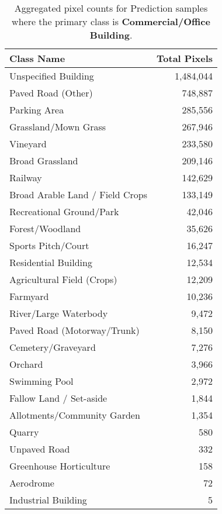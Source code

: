 \begin{table}[H] %
    \centering
    \caption{Aggregated pixel counts for Prediction samples where the primary class is \textbf{Commercial/Office Building}.}
    \label{tab:pred_counts_2}
    \begin{tabular}{lr}
        \hline
        \textbf{Class Name} & \textbf{Total Pixels} \\
        \hline
        Unspecified Building & 1,484,044 \\
        Paved Road (Other) & 748,887 \\
        Parking Area & 285,556 \\
        Grassland/Mown Grass & 267,946 \\
        Vineyard & 233,580 \\
        Broad Grassland & 209,146 \\
        Railway & 142,629 \\
        Broad Arable Land / Field Crops & 133,149 \\
        Recreational Ground/Park & 42,046 \\
        Forest/Woodland & 35,626 \\
        Sports Pitch/Court & 16,247 \\
        Residential Building & 12,534 \\
        Agricultural Field (Crops) & 12,209 \\
        Farmyard & 10,236 \\
        River/Large Waterbody & 9,472 \\
        Paved Road (Motorway/Trunk) & 8,150 \\
        Cemetery/Graveyard & 7,276 \\
        Orchard & 3,966 \\
        Swimming Pool & 2,972 \\
        Fallow Land / Set-aside & 1,844 \\
        Allotments/Community Garden & 1,354 \\
        Quarry & 580 \\
        Unpaved Road & 332 \\
        Greenhouse Horticulture & 158 \\
        Aerodrome & 72 \\
        Industrial Building & 5 \\
        \hline
    \end{tabular}
\end{table}

